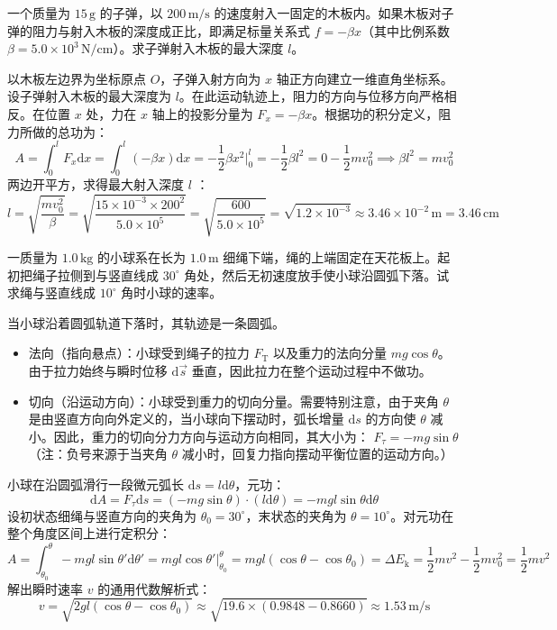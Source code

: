 \documentclass[lang=cn,11pt]{elegantbook}
\begin{document}
\begin{exercise}
一个质量为 $15\,\text{g}$ 的子弹，以 $200\,\text{m/s}$ 的速度射入一固定的木板内。如果木板对子弹的阻力与射入木板的深度成正比，即满足标量关系式 $f = -\beta x$（其中比例系数 $\beta = 5.0 \times 10^3\,\text{N/cm}$）。求子弹射入木板的最大深度 $l$。
\end{exercise}
\begin{solution}
以木板左边界为坐标原点 $O$，子弹入射方向为 $x$ 轴正方向建立一维直角坐标系。设子弹射入木板的最大深度为 $l$。在此运动轨迹上，阻力的方向与位移方向严格相反。在位置 $x$ 处，力在 $x$ 轴上的投影分量为 $F_x = -\beta x$。根据功的积分定义，阻力所做的总功为：
$$A = \int_{0}^{l} F_x \mathrm{d}x = \int_{0}^{l} (-\beta x) \mathrm{d}x = -\frac{1}{2}\beta x^2 \Big|_0^l = -\frac{1}{2}\beta l^2= 0 - \frac{1}{2}mv_0^2 \implies \beta l^2 = mv_0^2$$
两边开平方，求得最大射入深度 $l$ ：$$l = \sqrt{\frac{mv_0^2}{\beta}}= \sqrt{\frac{15 \times 10^{-3} \times 200^2}{5.0 \times 10^5}}= \sqrt{\frac{600}{5.0 \times 10^5}} = \sqrt{1.2 \times 10^{-3}} \approx 3.46 \times 10^{-2}\,\text{m} = 3.46\,\text{cm}$$
\end{solution}

\begin{exercise}
一质量为 $1.0\,\text{kg}$ 的小球系在长为 $1.0\,\text{m}$ 细绳下端，绳的上端固定在天花板上。起初把绳子拉侧到与竖直线成 $30^\circ$ 角处，然后无初速度放手使小球沿圆弧下落。试求绳与竖直线成 $10^\circ$ 角时小球的速率。
\end{exercise}
\begin{solution}
 当小球沿着圆弧轨道下落时，其轨迹是一条圆弧。
 \begin{itemize}
 \item 法向（指向悬点）：小球受到绳子的拉力 $F_{\text{T}}$ 以及重力的法向分量 $mg\cos\theta$。由于拉力始终与瞬时位移 $\mathrm{d}\vec{s}$ 垂直，因此拉力在整个运动过程中不做功。
 \item 切向（沿运动方向）：小球受到重力的切向分量。需要特别注意，由于夹角 $\theta$ 是由竖直方向向外定义的，当小球向下摆动时，弧长增量 $\mathrm{d}s$ 的方向使 $\theta$ 减小。因此，重力的切向分力方向与运动方向相同，其大小为： \(F_\tau = -mg\sin\theta\) （注：负号来源于当夹角 $\theta$ 减小时，回复力指向摆动平衡位置的运动方向。）
 \end{itemize}
 小球在沿圆弧滑行一段微元弧长 $\mathrm{d}s = l\mathrm{d}\theta$，元功：
 $$\mathrm{d}A = F_\tau \mathrm{d}s = (-mg\sin\theta) \cdot (l\mathrm{d}\theta) = -mgl\sin\theta\mathrm{d}\theta$$
 设初状态细绳与竖直方向的夹角为 $\theta_0 = 30^\circ$，末状态的夹角为 $\theta = 10^\circ$。对元功在整个角度区间上进行定积分：$$A = \int_{\theta_0}^{\theta} -mgl\sin\theta' \mathrm{d}\theta' = mgl\cos\theta' \Big|_{\theta_0}^{\theta} = mgl(\cos\theta - \cos\theta_0)=\Delta E_{\text{k}} = \frac{1}{2}mv^2 - \frac{1}{2}mv_0^2=\frac{1}{2}mv^2$$解出瞬时速率 $v$ 的通用代数解析式：$$v = \sqrt{2gl(\cos\theta - \cos\theta_0)} \approx \sqrt{19.6 \times (0.9848 - 0.8660)}\approx 1.53\,\text{m/s}$$
\end{solution}
\end{document}
